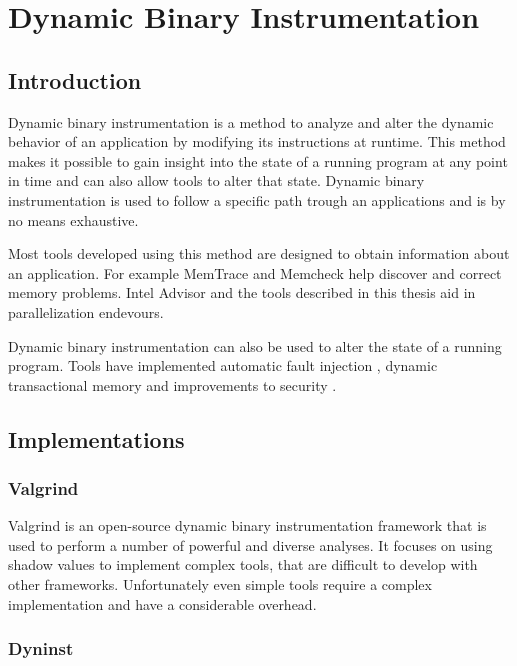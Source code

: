 \section {Dynamic Binary Instrumentation}

\subsection{Introduction}

Dynamic binary instrumentation is a method to analyze and alter the dynamic behavior of an application by modifying its instructions at runtime. This method makes it possible to gain insight into the state of a running program at any point in time and can also allow tools to alter that state. Dynamic binary instrumentation is used to follow a specific path trough an applications and is by no means exhaustive.

Most tools developed using this method are designed to obtain information about an application. For example MemTrace \cite{pindoc} and Memcheck \cite{memcheck} help discover and correct memory problems. Intel Advisor \cite{inteladvisor} and the tools described in this thesis aid in parallelization endevours.

Dynamic binary instrumentation can also be used to alter the state of a running program. Tools have implemented automatic fault injection \cite{faultinject}, dynamic transactional memory \cite{dynamicstm} and improvements to security \cite{dynamicstackprotect}.

\subsection{Implementations}

\subsubsection{Valgrind}

Valgrind \cite{valgrind} is an open-source dynamic binary instrumentation framework that is used to perform a number of powerful and diverse analyses. It focuses on using shadow values to implement complex tools, that are difficult to develop with other frameworks. Unfortunately even simple tools require a complex implementation and have a considerable overhead.

\subsubsection{Dyninst}

